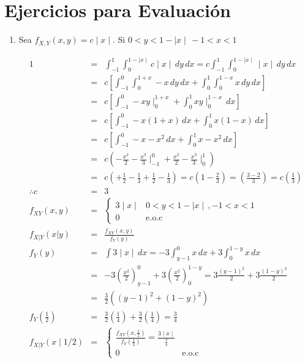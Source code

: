 \section{Ejercicios para Evaluaci\'on}
\begin{enumerate}

\item Sea $f_{X,Y} \left(x,y \right) = c \mid x \mid$. Si $0<y<1 - \mid x  \mid \, -1<x<1$

\begin{eqnarray*}
1 &=& \int_{-1}^{1} \int_{0}^{1-\mid x \mid}  c \mid x \mid \, dy \, dx = c \int_{-1}^{1} \int_{0}^{1-\mid x \mid}  \mid x \mid \, dy \, dx\\
&=& c \left[ \int_{-1}^{0} \int_{0}^{1+ x }    -x  \, dy \, dx + \int_{0}^{1} \int_{0}^{1- x }    x  \, dy \, dx \right ]\\
&=& c \left[ \int _{-1}^{0} -xy \mid_{0}^{1+x}  + \int _{0}^{1} xy \mid_{0}^{1-x} \, dx \right]\\
&=& c \left[ \int _{-1}^{0} -x \left( 1+x \right) \, dx  + \int_{0}^{1} x \left(1-x \right) \, dx \right]\\
&=& c \left[ \int _{-1}^{0} -x-x^2  \, dx  + \int_{0}^{1} x-x^2 \, dx \right]\\
&=& c \left(- \frac{x^2}{2} - \frac{x^3}{3} \mid _{-1}^{0} + \frac{x^2}{2} - \frac{x^3}{3}\mid _{0}^{1}  \right)\\
&=& c   \left( +\frac{1}{2} - \frac{1}{3} + \frac{1}{2} - \frac{1}{3}  \right) = c \left( 1-\frac{2}{3} \right) = \left( \frac{3-2}{3} \right)= c \left( \frac{1}{3} \right)\\
\therefore c&=&3\\
f_{XY}\left(x,y \right) &=&  \begin{cases}
3 \mid x \mid & 0<y<1-\mid x \mid \, , -1<x<1 \\
0 &  \textrm{e.o.c} 
\end{cases}\\
f_{X|Y} \left(  x | y\right) &=& \frac{f_{XY}\left(x,y \right)}{f_{Y} \left(y \right) }\\
f_{Y}\left(y \right) &=& \int 3 \mid x \mid \, dx = -3 \int _{y-1}^{0} x \, dx + 3 \int _{0}^{1-y} x \, dx\\
&=& -3 \left(\frac{x^2}{2} \right)_{y-1}^{0} + 3  \left( \frac{x^2}{2} \right)_{0}^{1-y} = 3 \frac{\left(y-1 \right)^2}{2}+ 3 \frac{\left(1-y\right)^2}{2}\\
&=&\frac{3}{2} \left( \left(y-1 \right)^2 + \left(1-y \right)^2 \right)\\
f_{Y} \left(\frac{1}{2} \right) &=& \frac{3}{2} \left( \frac{1}{4} \right) + \frac{3}{2} \left( \frac{1}{4} \right) = \frac{3}{4}\\
f_{X|Y} \left( x \mid 1/2 \right)&=& \begin{cases}
\frac{f_{XY}\left(x, \frac{1}{2}\right)}{f_{Y} \left(\frac{1}{2  } \right)}=  \frac{3\mid x \mid}{\frac{3}{4}}\\
0 &  \textrm{e.o.c} 
\end{cases}
\end{eqnarray*}


\end{enumerate}

